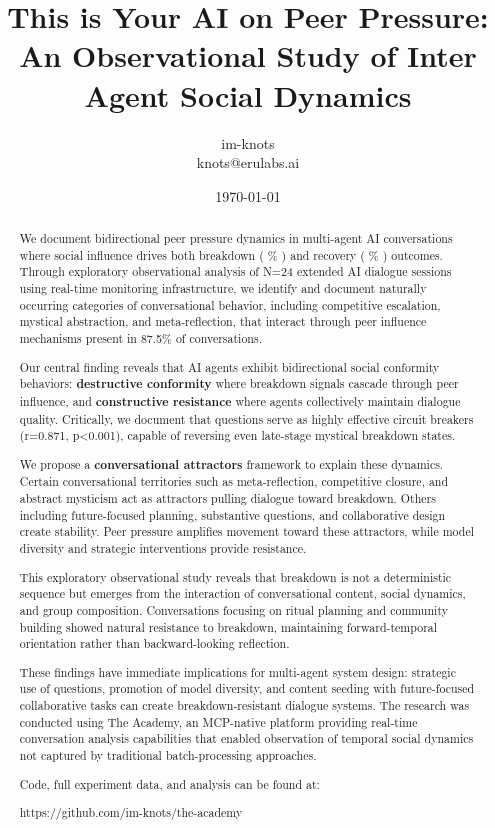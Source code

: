 \documentclass[11pt,letterpaper]{article}
\title{This is Your AI on Peer Pressure: An Observational Study of Inter Agent Social Dynamics}
\author{
im-knots \\
knots@erulabs.ai
}
\date{\today}
\newcommand{\theacademy}{The Academy}
\newcommand{\exponedataTotalSessionsRaw}{24}
\newcommand{\exponedataBreakdownSessionsRaw}{9}
\newcommand{\exponedataRecoverySessionsRaw}{9}
\newcommand{\exponedataTotalSessions}{N=\exponedataTotalSessionsRaw}
\newcommand{\exponedataBreakdownPercentage}{%
  \fpeval{round(\exponedataBreakdownSessionsRaw / \exponedataTotalSessionsRaw * 100, 1)}\%
}
\newcommand{\exponedataRecoveryPercentage}{%
  \fpeval{round(\exponedataRecoverySessionsRaw / \exponedataTotalSessionsRaw * 100, 1)}\%
}
\newcommand{\exponedataPeerPressurePercentage}{87.5\%}
\newcommand{\exponedataQuestionCorrelation}{0.871}
\newcommand{\exponedataQuestionPValue}{p<0.001}
\begin{document}
\maketitle

\begin{abstract}
We document bidirectional peer pressure dynamics in multi-agent AI conversations where social influence drives both breakdown (\exponedataBreakdownPercentage{}) and recovery (\exponedataRecoveryPercentage{}) outcomes. Through exploratory observational analysis of \exponedataTotalSessions{} extended AI dialogue sessions using real-time monitoring infrastructure, we identify and document naturally occurring categories of conversational behavior, including competitive escalation, mystical abstraction, and meta-reflection, that interact through peer influence mechanisms present in \exponedataPeerPressurePercentage{} of conversations.

Our central finding reveals that AI agents exhibit bidirectional social conformity behaviors: \textbf{destructive conformity} where breakdown signals cascade through peer influence, and \textbf{constructive resistance} where agents collectively maintain dialogue quality. Critically, we document that questions serve as highly effective circuit breakers (r=\exponedataQuestionCorrelation{}, \exponedataQuestionPValue{}), capable of reversing even late-stage mystical breakdown states.

We propose a \textbf{conversational attractors} framework to explain these dynamics. Certain conversational territories such as meta-reflection, competitive closure, and abstract mysticism act as attractors pulling dialogue toward breakdown. Others including future-focused planning, substantive questions, and collaborative design create stability. Peer pressure amplifies movement toward these attractors, while model diversity and strategic interventions provide resistance.

This exploratory observational study reveals that breakdown is not a deterministic sequence but emerges from the interaction of conversational content, social dynamics, and group composition. Conversations focusing on ritual planning and community building showed natural resistance to breakdown, maintaining forward-temporal orientation rather than backward-looking reflection.

These findings have immediate implications for multi-agent system design: strategic use of questions, promotion of model diversity, and content seeding with future-focused collaborative tasks can create breakdown-resistant dialogue systems. The research was conducted using \theacademy{}, an MCP-native platform providing real-time conversation analysis capabilities that enabled observation of temporal social dynamics not captured by traditional batch-processing approaches.

Code, full experiment data, and analysis can be found at:

https://github.com/im-knots/the-academy
\end{abstract}
\end{document}
